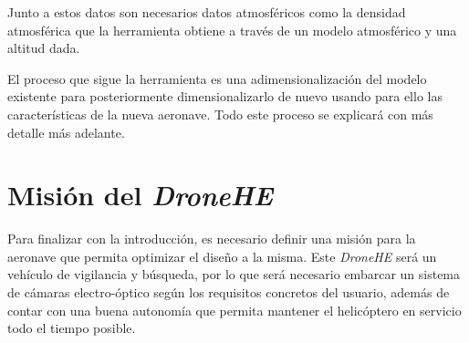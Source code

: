 Junto a estos datos son necesarios datos atmosféricos como la densidad atmosférica que la herramienta obtiene a través de un modelo atmosférico y una altitud dada.

El proceso que sigue la herramienta es una adimensionalización del modelo existente para posteriormente dimensionalizarlo de nuevo usando para ello las características de la nueva aeronave. Todo este proceso se explicará con más detalle más adelante.

\section{Misión del \emph{DroneHE}}

Para finalizar con la introducción, es necesario definir una misión para la aeronave que permita optimizar el diseño a la misma.
Este \emph{DroneHE} será un vehículo de vigilancia y búsqueda, por lo que será necesario embarcar un sistema de cámaras electro-óptico según los requisitos concretos del usuario, además de contar con una buena autonomía que permita mantener el helicóptero en servicio todo el tiempo posible.

\singlespace
